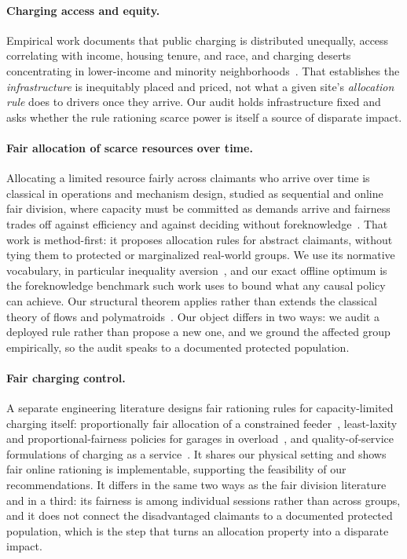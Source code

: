 \documentclass[manuscript, screen, review, anonymous]{acmart}
\begin{document}
\paragraph{Charging access and equity.}
Empirical work documents that public charging is distributed unequally, access correlating with income, housing tenure, and race, and charging deserts concentrating in lower-income and minority neighborhoods~\cite{hsu2021public,khan2022inequitable,caulfield2022measuring,yu2025equity,lou2024income}. That establishes the \emph{infrastructure} is inequitably placed and priced, not what a given site's \emph{allocation rule} does to drivers once they arrive. Our audit holds infrastructure fixed and asks whether the rule rationing scarce power is itself a source of disparate impact.
\paragraph{Fair allocation of scarce resources over time.}
Allocating a limited resource fairly across claimants who arrive over time is classical in operations and mechanism design, studied as sequential and online fair division, where capacity must be committed as demands arrive and fairness trades off against efficiency and against deciding without foreknowledge~\cite{sinclair2023sequential,benade2018make}. That work is method-first: it proposes allocation rules for abstract claimants, without tying them to protected or marginalized real-world groups. We use its normative vocabulary, in particular inequality aversion~\cite{atkinson1970measurement,mo2000fair,moulin2003fair}, and our exact offline optimum is the foreknowledge benchmark such work uses to bound what any causal policy can achieve. Our structural theorem applies rather than extends the classical theory of flows and polymatroids~\cite{gale1957theorem,edmonds2003submodular,megiddo1974optimal,fujishige2005submodular}. Our object differs in two ways: we audit a deployed rule rather than propose a new one, and we ground the affected group empirically, so the audit speaks to a documented protected population.
\paragraph{Fair charging control.}
A separate engineering literature designs fair rationing rules for capacity-limited charging itself: proportionally fair allocation of a constrained feeder~\cite{ardakanian2013distributed}, least-laxity and proportional-fairness policies for garages in overload~\cite{zeballos2019proportional}, and quality-of-service formulations of charging as a service~\cite{danner2021quality}. It shares our physical setting and shows fair online rationing is implementable, supporting the feasibility of our recommendations. It differs in the same two ways as the fair division literature and in a third: its fairness is among individual sessions rather than across groups, and it does not connect the disadvantaged claimants to a documented protected population, which is the step that turns an allocation property into a disparate impact.
\end{document}

